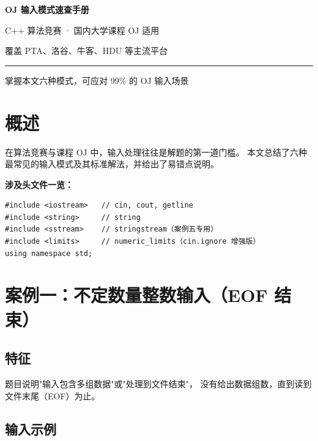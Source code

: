\documentclass[12pt, a4paper]{article}
\begin{document}
\begin{titlepage}
  \centering
  \vspace*{3cm}
  {\Huge\bfseries OJ 输入模式速查手册}\par
  \vspace{0.8cm}
  {\large C++ 算法竞赛 · 国内大学课程 OJ 适用}\par
  \vspace{0.4cm}
  {\normalsize 覆盖 PTA、洛谷、牛客、HDU 等主流平台}\par
  \vspace{2cm}
  \rule{0.6\linewidth}{0.5pt}\par
  \vspace{0.4cm}
  {\small 掌握本文六种模式，可应对 99\% 的 OJ 输入场景}\par
  \vfill
\end{titlepage}

\tableofcontents
\newpage

\section{概述}

在算法竞赛与课程 OJ 中，输入处理往往是解题的第一道门槛。
本文总结了六种最常见的输入模式及其标准解法，并给出了易错点说明。

\textbf{涉及头文件一览：}

\begin{lstlisting}[style=cpp, numbers=none]
#include <iostream>   // cin, cout, getline
#include <string>     // string
#include <sstream>    // stringstream（案例五专用）
#include <limits>     // numeric_limits（cin.ignore 增强版）
using namespace std;
\end{lstlisting}

\section{案例一：不定数量整数输入（EOF 结束）}

\subsection{特征}

题目说明"输入包含多组数据"或"处理到文件结束"，
没有给出数据组数，直到读到文件末尾（EOF）为止。

\subsection{输入示例}
\end{document}
